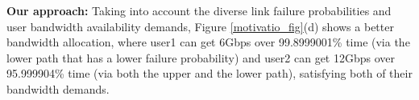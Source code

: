 \documentclass[sigconf]{acmart}
\begin{document}
\textbf{Our approach:}
Taking into account the diverse link failure probabilities and user bandwidth availability demands, 
Figure \ref{motivatio_fig}(d) shows a better bandwidth allocation, 
where user1 can get 6Gbps over 99.8999001\% time (via the lower path that has a lower failure probability) and user2 can get 12Gbps over 95.999904\% time (via both the upper and the lower path), 
satisfying both of their bandwidth demands. 

\end{document}
